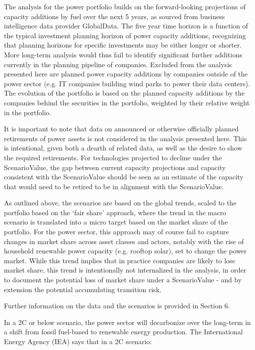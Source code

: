 \documentclass[10pt,table,a4]{article}\usepackage[]{graphicx}\usepackage[]{color}
\begin{document}
	
	\begin{multicols}{2}
		
		The analysis for the power portfolio builds on the forward-looking projections of capacity additions by fuel over the next 5 years, as sourced from business intelligence data provider GlobalData. The five year time horizon is a function of the typical investment planning horizon of power capacity additions, recognizing that planning horizons for specific investments may be either longer or shorter. More long-term analysis would thus fail to identify significant further additions currently in the planning pipeline of companies. Excluded from the analysis presented here are planned power capacity additions by companies outside of the power sector (e.g. IT companies building wind parks to power their data centers). The evolution of the portfolio is based on the planned capacity additions by the companies behind the securities in the portfolio, weighted by their relative weight in the portfolio. 
		
		It is important to note that data on announced or otherwise officially planned retirements of power assets is not considered in the analysis presented here. This is intentional, given both a dearth of related data, as well as the desire to show the required retirements. For technologies projected to decline under the ScenarioValue, the gap between current capacity projections and capacity consistent with the ScenarioValue should be seen as an estimate of the capacity that would need to be retired to be in alignment with the ScenarioValue. 
		
		As outlined above, the scenarios are based on the global trends, scaled to the portfolio based on the `fair share' approach, where the trend in the macro scenario is translated into a micro target based on the market share of the portfolio. For the power sector, this approach may of course fail to capture changes in market share across asset classes and actors, notably with the rise of household renewable power capacity (e.g. rooftop solar), set to change the power market. While this trend implies that in practice companies are likely to lose market share, this trend is intentionally not internalized in the analysis, in order to document the potential loss of market share under a ScenarioValue - and by extension the potential accumulating transition risk.
		
		Further information on the data and the scenarios is provided in Section 6. 
		
		In a 2\degree C or below scenario, the power sector will decarbonize over the long-term in a shift from fossil fuel-based to renewable energy production. The International Energy Agency (IEA) says that in a 2\degree C scenario:
		

\end{multicols}
\end{document}
